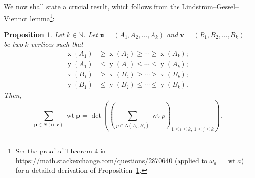 \documentclass[reqno]{amsart}%
\newcommand{\0}{\phantom{c}}
\let\sumnonlimits\sum
\renewcommand{\sum}{\sumnonlimits\limits}
\theoremstyle{plain}
\newtheorem{prop}[thm]{Proposition}
\theoremstyle{definition}
\numberwithin{equation}{section}
\begin{document}
We now shall state a crucial result, which follows from the
Lindstr\"om--Gessel--Viennot lemma\footnote{See the proof of
Theorem 4 in
\url{https://math.stackexchange.com/questions/2870640}
(applied to $\omega_a = \operatorname{wt} a$) for a detailed
derivation of Proposition~\ref{prop.LGV.concrete}.}:

\begin{prop}
\label{prop.LGV.concrete}Let $k\in\mathbb{N}$. Let $\mathbf{u}=\left(
A_{1},A_{2},\ldots,A_{k}\right)  $ and $\mathbf{v}=\left(  B_{1},B_{2}%
,\ldots,B_{k}\right)  $ be two $k$-vertices such that%
\begin{align*}
\operatorname*{x}\left(  A_{1}\right)   &  \geq\operatorname*{x}\left(
A_{2}\right)  \geq\cdots\geq\operatorname*{x}\left(  A_{k}\right)  ;\\
\operatorname*{y}\left(  A_{1}\right)   &  \leq\operatorname*{y}\left(
A_{2}\right)  \leq\cdots\leq\operatorname*{y}\left(  A_{k}\right)  ;\\
\operatorname*{x}\left(  B_{1}\right)   &  \geq\operatorname*{x}\left(
B_{2}\right)  \geq\cdots\geq\operatorname*{x}\left(  B_{k}\right)  ;\\
\operatorname*{y}\left(  B_{1}\right)   &  \leq\operatorname*{y}\left(
B_{2}\right)  \leq\cdots\leq\operatorname*{y}\left(  B_{k}\right)  .
\end{align*}
Then,%
\[
\sum_{\mathbf{p}\in N\left(  \mathbf{u},\mathbf{v}\right)  }\operatorname*{wt}%
\mathbf{p}=\det\left(  \left(  \sum_{p\in N\left(  A_{i},B_{j}\right)
}\operatorname*{wt}p\right)  _{1\leq i\leq k,\ 1\leq j\leq k}\right)  .
\]

\end{prop}
\end{document}
